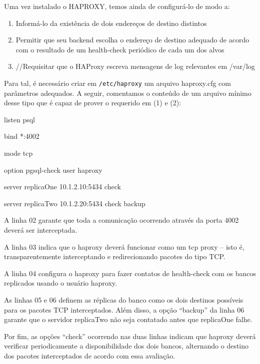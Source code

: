 \documentclass[a4paper,10pt]{article}
\begin{document}
        Uma vez instalado o HAPROXY, temos ainda de configurá-lo de modo a:

        \begin{enumerate}
        \item Informá-lo da existência de dois endereços de destino distintos
        \item Permitir que seu backend escolha o endereço de destino adequado de acordo com o resultado de um health-check periódico de cada um dos alvos
        \item //Requisitar que o HAProxy escreva mensagens de log relevantes em /var/log
        \end{enumerate}

        Para tal, é necessário criar em \verb|/etc/haproxy| um arquivo haproxy.cfg com parâmetros adequados.
        A seguir, comentamos o conteúdo de um arquivo mínimo desse tipo que é capaz de prover o requerido em (1) e (2):

       \begin{spverbatim}
        listen psql

       bind    *:4002

       mode  tcp

       option  pgsql-check user haproxy

       server  replicaOne  10.1.2.10:5434 check

       server  replicaTwo  10.1.2.20:5434 check backup
        \end{spverbatim}

        A linha 02 garante que toda a comunicação ocorrendo através da porta 4002 deverá ser interceptada.

        A linha 03 indica  que o haproxy deverá funcionar como um tcp proxy – isto é, transparentemente interceptando e redirecionando pacotes do tipo TCP.

        A linha 04 configura o haproxy para fazer contatos de health-check com os bancos replicados usando o usuário haproxy.

        As linhas 05 e 06 definem as réplicas do banco como os dois destinos possíveis para os pacotes TCP interceptados. Além disso, a opção “backup” da linha 06 garante que o servidor replicaTwo não seja contatado antes que replicaOne falhe.

        Por fim, as opções “check” ocorrendo nas duas linhas indicam que haproxy deverá verificar periodicamente a disponibilidade dos dois bancos, alternando o destino dos pacotes interceptados de acordo com essa avaliação.
\end{document}
